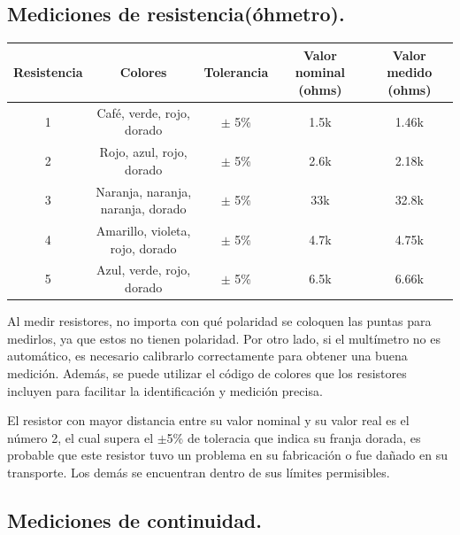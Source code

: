\documentclass[10pt]{article}
\begin{document}
\begin{multicols}{2}
\subsection{Mediciones de resistencia(óhmetro).}
\begin{center}
	\begin{adjustbox}{width=245pt}
		\begin{tabular}{|c|c|c|c|c|}
			\hline
			Resistencia & Colores & Tolerancia & Valor nominal (ohms) & Valor medido (ohms) \\
			\hline
			1 & Café, verde, rojo, dorado & $\pm$ 5\% & 1.5k & 1.46k \\
			\hline
			2 & Rojo, azul, rojo, dorado & $\pm$ 5\% & 2.6k & 2.18k \\
			\hline
			3 & Naranja, naranja, naranja, dorado & $\pm$ 5\% & 33k & 32.8k \\
			\hline
			4 & Amarillo, violeta, rojo, dorado & $\pm$ 5\% & 4.7k & 4.75k \\
			\hline
			5 & Azul, verde, rojo, dorado & $\pm$ 5\% & 6.5k & 6.66k \\
			\hline
		\end{tabular}
	\end{adjustbox}
\end{center}

Al medir resistores, no importa con qué polaridad se coloquen las puntas para medirlos, ya que estos no tienen polaridad. Por otro lado, si el multímetro no es automático, es necesario calibrarlo correctamente para obtener una buena medición. Además, se puede utilizar el código de colores que los resistores incluyen para facilitar la identificación y medición precisa.

El resistor con mayor distancia entre su valor nominal y su valor real es el número 2, el cual supera el $\pm$5\% de toleracia que indica su franja dorada, es probable que este resistor tuvo un problema en su fabricación o fue dañado en su transporte. Los demás se encuentran dentro de sus límites permisibles.
\subsection{Mediciones de continuidad.}


\end{multicols}
\end{document}
